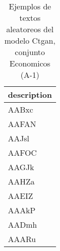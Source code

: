 \begin{table}[H]
\centering
\fontsize{8}{14}\selectfont
\caption{Ejemplos de textos aleatoreos del modelo Ctgan, conjunto Economicos (A-1)}
\label{table-sample10-economicos-a-1-ctgan-text}
\begin{tabular}{|m{50em}|}
\hline
\rowcolor[gray]{0.8}
description \\
\hline AABxc \\
\hline AAFAN \\
\hline AAJsl \\
\hline AAFOC \\
\hline AAGJk \\
\hline AAHZa \\
\hline AAEIZ \\
\hline AAAkP \\
\hline AADmh \\
\hline AAARu \\
\hline
\end{tabular}
\end{table}
